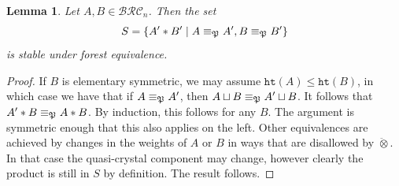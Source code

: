 \documentclass{amsart}
\newtheorem{lemma}{Lemma}[subsection]
\newtheorem{theorem}{Theorem}[section]
\theoremstyle{definition}
\newtheorem{definition}[lemma]{Definition}
\theoremstyle{remark}
\numberwithin{equation}{subsection}
\newcommand{\wof}[1]{w_{#1}}
\newcommand{\hr}{\mathtt{ht}}
\newcommand{\BRC}{\mathcal{BRC}}
\newcommand{\code}{\mathfrak{c}}
\begin{document}
\begin{lemma}
Let $A,B\in \BRC_n$. Then the set
$$S=\{A'*B'\mid A\equiv_{\mathfrak{P}} A', B\equiv_{\mathfrak{P}} B'\}$$
is stable under forest equivalence.
\end{lemma}
\begin{proof}
If $B$ is elementary symmetric, we may assume $\hr(A)\leq \hr(B)$, in which case we have that if $A\equiv_{\mathfrak{P}} A'$, then $A\sqcup B\equiv_{\mathfrak{P}} A'\sqcup B$. It follows that $A'*B\equiv_{\mathfrak{P}} A*B$. By induction, this follows for any $B$. The argument is symmetric enough that this also applies on the left. Other equivalences are achieved by changes in the weights of $A$ or $B$ in ways that are disallowed by $\ddot{\otimes}$. In that case the quasi-crystal component may change, however clearly the product is still in $S$ by definition. The result follows.
\end{proof}


\end{document}
